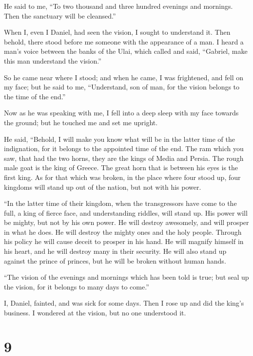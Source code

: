  He said to me, ``To two thousand and three hundred
evenings and mornings. Then the sanctuary will be cleansed.''

 When I, even I Daniel, had seen the vision, I sought to
understand it. Then behold, there stood before me someone with the
appearance of a man.  I heard a man's voice between the
banks of the Ulai, which called and said, ``Gabriel, make this man
understand the vision.''

 So he came near where I stood; and when he came, I was
frightened, and fell on my face; but he said to me, ``Understand, son of
man, for the vision belongs to the time of the end.''

 Now as he was speaking with me, I fell into a deep sleep
with my face towards the ground; but he touched me and set me upright.

 He said, ``Behold, I will make you know what will be in
the latter time of the indignation, for it belongs to the appointed time
of the end.  The ram which you saw, that had the two horns,
they are the kings of Media and Persia.  The rough male
goat is the king of Greece. The great horn that is between his eyes is
the first king.  As for that which was broken, in the place
where four stood up, four kingdoms will stand up out of the nation, but
not with his power.

 ``In the latter time of their kingdom, when the
transgressors have come to the full, a king of fierce face, and
understanding riddles, will stand up.  His power will be
mighty, but not by his own power. He will destroy awesomely, and will
prosper in what he does. He will destroy the mighty ones and the holy
people.  Through his policy he will cause deceit to prosper
in his hand. He will magnify himself in his heart, and he will destroy
many in their security. He will also stand up against the prince of
princes, but he will be broken without human hands.

 ``The vision of the evenings and mornings which has been
told is true; but seal up the vision, for it belongs to many days to
come.''

 I, Daniel, fainted, and was sick for some days. Then I
rose up and did the king's business. I wondered at the vision, but no
one understood it.

\hypertarget{section-8}{%
\section{9}\label{section-8}}

